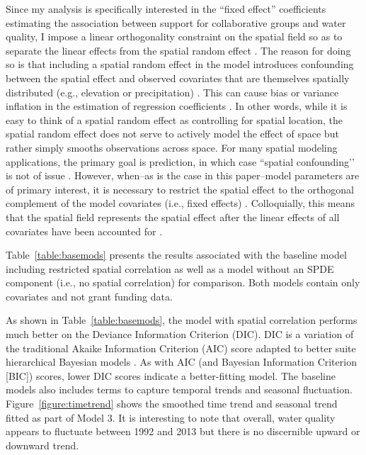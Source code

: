 \documentclass[12pt,a4paper,titlepage]{article}
\begin{document}
Since my analysis is specifically interested in the ``fixed effect'' coefficients estimating the association between support for collaborative groups and water quality, I impose a linear orthogonality constraint on the spatial field so as to separate the linear effects from the spatial random effect \parencite{ingebrigtsen2015}. The reason for doing so is that including a spatial random effect in the model introduces confounding between the spatial effect and observed covariates that are themselves spatially distributed (e.g., elevation or precipitation) \parencite{hodges2014}. This can cause bias or variance inflation in the estimation of regression coefficients \parencite{hughes2014}. In other words, while it is easy to think of a spatial random effect as controlling for spatial location, the spatial random effect does not serve to actively model the effect of space but rather simply smooths observations across space. For many spatial modeling applications, the primary goal is prediction, in which case ``spatial confounding’’ \parencite{reich2006} is not of issue \parencite{hughes2014}. However, when--as is the case in this paper--model parameters are of primary interest, it is necessary to restrict the spatial effect to the orthogonal complement of the model covariates (i.e., fixed effects) \parencite{hodges2010,hodges2014}. Colloquially, this means that the spatial field represents the spatial effect after the linear effects of all covariates have been accounted for \parencite{ingebrigtsen2015}.






Table~\ref{table:basemods} presents the results associated with the baseline model including restricted spatial correlation as well as a model without an SPDE component (i.e., no spatial correlation) for comparison. Both models contain only covariates and not grant funding data.



As shown in Table~\ref{table:basemods}, the model with spatial correlation performs much better on the Deviance Information Criterion (DIC). DIC is a variation of the traditional Akaike Information Criterion (AIC) score adapted to better suite hierarchical Bayesian models \parencite{ward2008,spiegelhalter2002}. As with AIC (and Bayesian Information Criterion [BIC]) scores, lower DIC scores indicate a better-fitting model. The baseline models also includes terms to capture temporal trends and seasonal fluctuation. Figure~\ref{figure:timetrend} shows the smoothed time trend and seasonal trend fitted as part of Model 3. It is interesting to note that overall, water quality appears to fluctuate between 1992 and 2013 but there is no discernible upward or downward trend.
\end{document}
